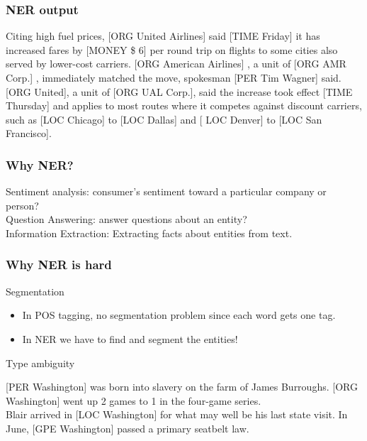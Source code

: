 \documentclass[13.5pt,aspecratio=169]{beamer}
\begin{document}
    
    
    
    \begin{frame}
    \onehalfspacing
        \frametitle{NER output}
        
        \begin{block}{}
            Citing high fuel prices, \color{blue}[ORG United Airlines] \color{black}said \color{blue} [TIME Friday] \color{black} it has increased fares by \color{blue} [MONEY \$ 6] \color{black} per round trip on flights to some cities also served by lower-cost carriers. \color{blue}[ORG American Airlines] \color{black}, a unit of \color{blue}[ORG AMR Corp.] \color{black}, immediately matched the move, spokesman \color{blue}[PER Tim Wagner] \color{black}said. \color{blue}[ORG United]\color{black}, a unit of \color{blue}[ORG UAL Corp.]\color{black}, said the increase took effect \color{blue}[TIME Thursday] \color{black} and applies to most routes where it competes against discount carriers, such as \color{blue}[LOC Chicago] \color{black} to \color{blue}[LOC Dallas] \color{black} and \color{blue}[ LOC Denver] \color{black}to \color{blue}[LOC San Francisco]\color{black}.
        \end{block}	
    \end{frame}
    \begin{frame}
    \onehalfspacing
        \frametitle{Why NER?}	
        \begin{block}{}
            Sentiment analysis: consumer’s sentiment toward a particular company or person?
            \\  \bigskip
                 Question Answering: answer questions about an entity?
              \\  \bigskip
                 Information Extraction: Extracting facts about entities from text.
        \end{block}	
    \end{frame}
    \begin{frame}
    \onehalfspacing
        \frametitle{Why NER is hard}	
        \begin{block}{Segmentation}
        \begin{itemize}
            \item In POS tagging, no segmentation problem since each word gets one tag.
                \item In NER we have to find and segment the entities!
        \end{itemize}
        \end{block}	
     \begin{block}{Type ambiguity}
         
    \color{blue} [PER Washington] \color{black} was born into slavery on the farm of James Burroughs. \color{blue}[ORG Washington] \color{black}went up 2 games to 1 in the four-game series. \\ 
    Blair arrived in \color{blue}[LOC Washington] \color{black} for what may well be his last state visit. In June, \color{blue}[GPE Washington] \color{black} passed a primary seatbelt law.
     \end{block}
    \end{frame}
\end{document}

